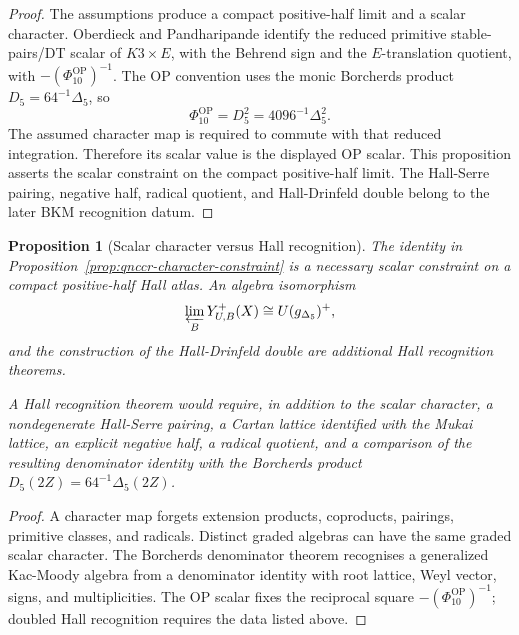 \documentclass[11pt]{article}
\providecommand{\Yplus}{Y^{+}}
\providecommand{\DeltaFive}{\Delta_{5}}
\providecommand{\Dfive}{D_{5}}
\providecommand{\PhiTenOP}{\Phi_{10}^{\mathrm{OP}}}
\theoremstyle{plain}
\newtheorem{proposition}[theorem]{Proposition}
\theoremstyle{definition}
\begin{document}
\begin{proof}
The assumptions produce a compact positive-half limit and a scalar
character. Oberdieck and Pandharipande identify the reduced primitive
stable-pairs/DT scalar of \(K3\times E\), with the Behrend sign and the
\(E\)-translation quotient, with
\(-(\PhiTenOP)^{-1}\). The OP convention uses the monic Borcherds
product \(\Dfive=64^{-1}\DeltaFive\), so
\[
  \PhiTenOP=\Dfive^2=4096^{-1}\DeltaFive^2.
\]
The assumed character map is required to commute with that reduced
integration. Therefore its scalar value is the displayed OP scalar. This
proposition asserts the scalar constraint on the compact positive-half
limit. The Hall-Serre pairing, negative half, radical quotient, and
Hall-Drinfeld double belong to the later BKM recognition datum.
\end{proof}

\begin{proposition}[Scalar character versus Hall recognition]
\label{prop:scalar-character-boundary}
The identity in Proposition~\ref{prop:qnccr-character-constraint} is a
necessary scalar constraint on a compact positive-half Hall atlas. An
algebra isomorphism
\[
  \varprojlim_B\Yplus_{\mathfrak U,B}(X)
  \cong
  U(\mathfrak g_{\DeltaFive})^{+},
\]
and the construction of the Hall-Drinfeld double are additional Hall
recognition theorems.

A Hall recognition theorem would require, in addition to the scalar
character, a nondegenerate Hall-Serre pairing, a Cartan lattice
identified with the Mukai lattice, an explicit negative half, a radical
quotient, and a comparison of the resulting denominator identity with
the Borcherds product \(D_5(2Z)=64^{-1}\DeltaFive(2Z)\).
\end{proposition}

\begin{proof}
A character map forgets extension products, coproducts, pairings,
primitive classes, and radicals. Distinct graded algebras can have the
same graded scalar character. The Borcherds denominator theorem
recognises a generalized Kac-Moody algebra from a denominator identity
with root lattice, Weyl vector, signs, and multiplicities. The OP
scalar fixes the reciprocal square
\(-(\PhiTenOP)^{-1}\); doubled Hall recognition requires the data
listed above.
\end{proof}
\end{document}
